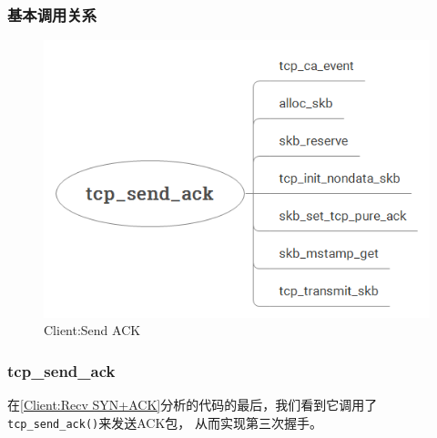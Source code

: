 		\subsubsection{基本调用关系}
		            \begin{figure}[htb]        
		                \centering
		                \includegraphics[width=\textwidth]  {images/Client:Send ACK.png}
						\caption{Client:Send ACK}
						\label{Client:Send ACK}
		            \end{figure} 
		
		\subsubsection{tcp\_send\_ack}
			\label{Client:tcp_send_ack}
				在\ref{Client:Recv SYN+ACK}分析的代码的最后，我们看到它调用了\texttt{tcp_send_ack()}来发送ACK包，
				从而实现第三次握手。

